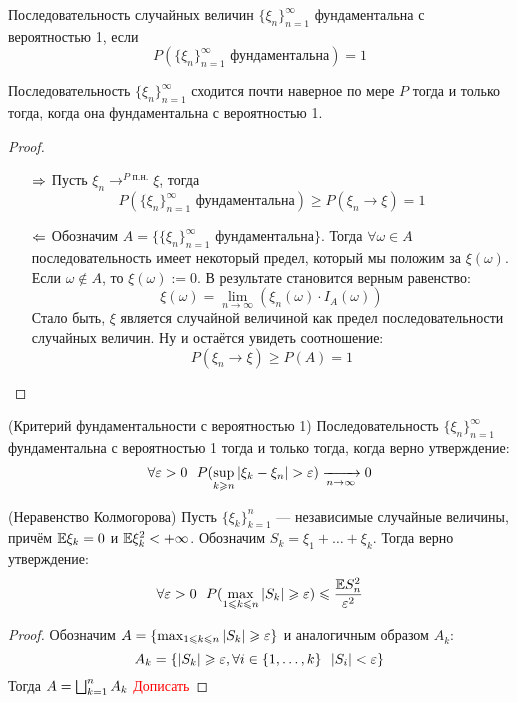 \begin{definition}
	Последовательность случайных величин $\{\xi_n\}_{n = 1}^\infty$ фундаментальна с вероятностью 1, если
	\[
		P(\{\xi_n\}_{n = 1}^\infty \text{ фундаментальна}) = 1
	\]
\end{definition}

\begin{proposition}
	Последовательность $\{\xi_n\}_{n = 1}^\infty$ сходится почти наверное по мере $P$ тогда и только тогда, когда она фундаментальна с вероятностью 1.
\end{proposition}

\begin{proof}~
	\begin{itemize}
		\item[$\Rightarrow$] Пусть $\xi_n \to^{P\text{ п.н.}} \xi$, тогда
		\[
			P(\{\xi_n\}_{n = 1}^\infty \text{ фундаментальна}) \ge P(\xi_n \to \xi) = 1
		\]
		
		\item [$\Leftarrow$] Обозначим $A = \{\{\xi_n\}_{n = 1}^\infty \text{ фундаментальна}\}$. Тогда $\forall \omega \in A$ последовательность имеет некоторый предел, который мы положим за $\xi(\omega)$. Если $\omega \notin A$, то $\xi(\omega) := 0$. В результате становится верным равенство:
		\[
			\xi(\omega) = \lim_{n \to \infty} (\xi_n(\omega) \cdot I_A(\omega))
		\]
		Стало быть, $\xi$ является случайной величиной как предел последовательности случайных величин. Ну и остаётся увидеть соотношение:
		\[
			P(\xi_n \to \xi) \ge P(A) = 1
		\]
	\end{itemize}
\end{proof}

\begin{theorem} (Критерий фундаментальности с вероятностью 1)
	Последовательность $\{\xi_n\}_{n = 1}^\infty$ фундаментальна с вероятностью 1 тогда и только тогда, когда верно утверждение:
	\[
		\forall \eps > 0\ \ P(\sup_{k \ge n} |\xi_k - \xi_n| > \eps) \xrightarrow[n \to \infty]{} 0
	\]
\end{theorem}

\begin{theorem} (Неравенство Колмогорова)
	Пусть $\{\xi_k\}_{k = 1}^n$ --- независимые случайные величины, причём $\mathbb{E}\xi_k = 0$ и $\mathbb{E}\xi_k^2 < +\infty$. Обозначим $S_k = \xi_1 + \ldots + \xi_k$. Тогда верно утверждение:
	\[
		\forall \varepsilon > 0\ \ P(\max_{1 \leqslant k \leqslant n} |S_k| \geqslant \varepsilon) \leqslant \frac{\mathbb{E} S_n^2}{\varepsilon^2}
	\]
\end{theorem}

\begin{proof}
	Обозначим $A = \{\max_{1 \leqslant k \leqslant n} |S_k| \geqslant \varepsilon\}$ и аналогичным образом $A_k$:
	\[
		A_k = \{|S_k| \geqslant \varepsilon, \forall i \in \{1, \ldots, k\}\ \ |S_i| < \varepsilon\}
	\]
	Тогда $A = \bigsqcup_{k = 1}^n A_k$ \textcolor{red}{Дописать}
\end{proof}